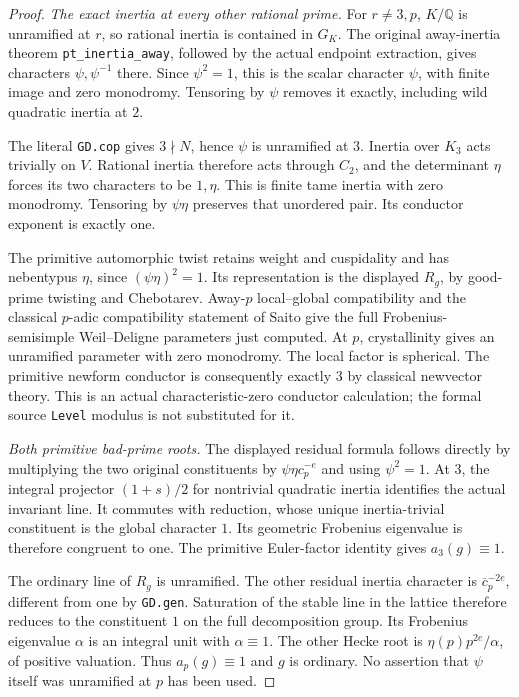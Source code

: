 \begin{proof}
\emph{The exact inertia at every other rational prime.}
For $r\ne3,p$, $K/\mathbb Q$ is unramified at $r$, so rational
inertia is contained in $G_K$.  The original away-inertia theorem
\texttt{pt\_inertia\_away}, followed by the actual endpoint extraction,
gives characters $\psi,\psi^{-1}$ there.  Since $\psi^2=1$, this is
the scalar character $\psi$, with finite image and zero monodromy.
Tensoring by $\psi$ removes it exactly, including wild quadratic
inertia at $2$.

The literal \texttt{GD.cop} gives $3\nmid N$, hence $\psi$ is
unramified at $3$.  Inertia over $K_3$ acts trivially on $V$.
Rational inertia therefore acts through $C_2$, and the determinant
$\eta$ forces its two characters to be $1,\eta$.  This is finite tame
inertia with zero monodromy.  Tensoring by $\psi\eta$ preserves that
unordered pair.  Its conductor exponent is exactly one.

The primitive automorphic twist retains weight and cuspidality and
has nebentypus $\eta$, since $(\psi\eta)^2=1$.
Its representation is the displayed $R_g$, by good-prime twisting
and Chebotarev.  Away-$p$ local--global compatibility and the
classical $p$-adic compatibility statement of Saito give the full
Frobenius-semisimple Weil--Deligne parameters just computed.
At $p$, crystallinity gives an unramified parameter with zero
monodromy.  The local factor is spherical.  The primitive newform
conductor is consequently exactly $3$ by classical newvector theory.
This is an actual characteristic-zero conductor calculation;
the formal source \texttt{Level} modulus is not substituted for it.

\emph{Both primitive bad-prime roots.}
The displayed residual formula follows directly by multiplying the
two original constituents by $\psi\eta c_p^{-e}$ and using $\psi^2=1$.
At $3$, the integral projector $(1+s)/2$ for nontrivial quadratic
inertia identifies the actual invariant line.  It commutes with
reduction, whose unique inertia-trivial constituent is the global
character $1$.  Its geometric Frobenius eigenvalue is therefore
congruent to one.  The primitive Euler-factor identity gives
$a_3(g)\equiv1$.

The ordinary line of $R_g$ is unramified.  The other residual inertia
character is $\overline c_p^{-2e}$, different from one by
\texttt{GD.gen}.  Saturation of the stable line in the lattice
therefore reduces to the constituent $1$ on the full decomposition
group.  Its Frobenius eigenvalue $\alpha$ is an integral unit with
$\alpha\equiv1$.  The other Hecke root is
$\eta(p)p^{2e}/\alpha$, of positive valuation.  Thus
$a_p(g)\equiv1$ and $g$ is ordinary.  No assertion that $\psi$ itself
was unramified at $p$ has been used.
\end{proof}

